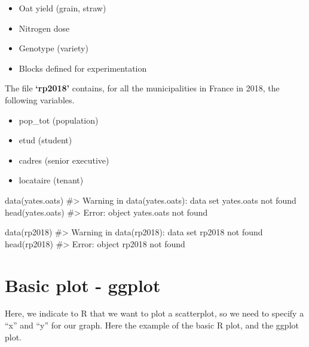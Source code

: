 \documentclass[
  letterpaper,
  DIV=11,
  numbers=noendperiod]{scrreprt}
\newenvironment{Shaded}{\begin{snugshade}}{\end{snugshade}}
\newcommand{\AttributeTok}[1]{\textcolor[rgb]{0.40,0.45,0.13}{#1}}
\newcommand{\CommentTok}[1]{\textcolor[rgb]{0.37,0.37,0.37}{#1}}
\newcommand{\FunctionTok}[1]{\textcolor[rgb]{0.28,0.35,0.67}{#1}}
\newcommand{\NormalTok}[1]{\textcolor[rgb]{0.00,0.23,0.31}{#1}}
\newcommand{\SpecialCharTok}[1]{\textcolor[rgb]{0.37,0.37,0.37}{#1}}
\begin{document}
\begin{itemize}
\item
  Oat yield (grain, straw)
\item
  Nitrogen dose
\item
  Genotype (variety)
\item
  Blocks defined for experimentation
\end{itemize}

The file \textbf{`rp2018'} contains, for all the municipalities in
France in 2018, the following variables.

\begin{itemize}
\item
  pop\_tot (population)
\item
  etud (student)
\item
  cadres (senior executive)
\item
  locataire (tenant)
\end{itemize}

\begin{Shaded}
\begin{Highlighting}[]

\FunctionTok{data}\NormalTok{(yates.oats)}
\CommentTok{\#\textgreater{} Warning in data(yates.oats): data set \textquotesingle{}yates.oats\textquotesingle{} not found}
\FunctionTok{head}\NormalTok{(yates.oats)}
\CommentTok{\#\textgreater{} Error: object \textquotesingle{}yates.oats\textquotesingle{} not found}

\FunctionTok{data}\NormalTok{(rp2018)}
\CommentTok{\#\textgreater{} Warning in data(rp2018): data set \textquotesingle{}rp2018\textquotesingle{} not found}
\FunctionTok{head}\NormalTok{(rp2018)}
\CommentTok{\#\textgreater{} Error: object \textquotesingle{}rp2018\textquotesingle{} not found}
\end{Highlighting}
\end{Shaded}

\section{Basic plot - ggplot}\label{basic-plot---ggplot}

Here, we indicate to R that we want to plot a scatterplot, so we need to
specify a ``x'' and ``y'' for our graph. Here the example of the basic R
plot, and the ggplot plot.

\begin{Shaded}
\end{Shaded}
\end{document}
